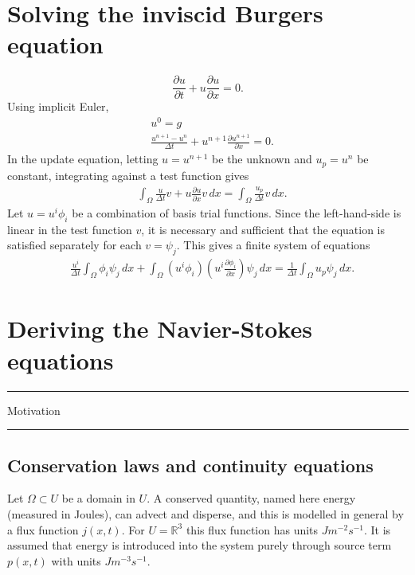 \documentclass{article}
\newcommand{\pdf}[2]{\frac{\partial #1}{\partial #2}}
\newcommand{\todo}[1]{\vskip 0.1in \hrule \vskip 0.03in {#1} \vskip 0.03in \hrule \vskip 0.1in}
\begin{document}
\section{Solving the inviscid Burgers equation}
\begin{equation}
    \pdf{u}{t} + u\pdf{u}{x} = 0.
\end{equation}
Using implicit Euler,
\begin{align*}
    &u^0 = g \\
    &\frac{u^{n+1} - u^n}{\Delta t} + u^{n+1}\pdf{u^{n+1}}{x} = 0.
\end{align*}
In the update equation, letting $u = u^{n+1}$ be the unknown and $u_p = u^n$ be constant, integrating against a test function gives
\begin{align*}
    &\int_\Omega \frac{u}{\Delta t}v + u\pdf{u}{x}v\,dx = \int_\Omega \frac{u_p}{\Delta t} v\,dx.
\end{align*}
Let $u = u^i\phi_i$ be a combination of basis trial functions. Since the left-hand-side is linear in the test function $v$, it is necessary and sufficient
that the equation is satisfied separately for each $v = \psi_j$. This gives a finite system of equations
\begin{align*}
    &\frac{u^i}{\Delta t}\int_\Omega \phi_i\psi_j\,dx + \int_{\Omega} (u^i\phi_i)(u^i \pdf{\phi_i}{x})\psi_j\,dx = \frac{1}{\Delta t}\int_\Omega u_p \psi_j\,dx.
\end{align*}




\section{Deriving the Navier-Stokes equations}
\todo{Motivation}
\subsection{Conservation laws and continuity equations} %
Let $\Omega \subset U$ be a domain in $U$. A conserved quantity, named here energy (measured in Joules), can advect and disperse, and this is modelled in general by
a flux function $j(x, t)$. For $U = \mathbb{R}^3$ this flux function has units $Jm^{-2}s^{-1}$.
It is assumed that energy is introduced into
the system purely through source term $p(x, t)$ with units $Jm^{-3}s^{-1}$.
\end{document}
